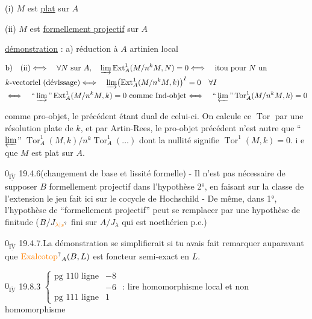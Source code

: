 (i) $M$ est \uline{plat} sur $A$

(ii) $M$ est \uline{formellement projectif} sur $A$

\uline{démonstration} : a) réduction à $A$ artinien local

\[
\begin{aligned}
&\text{b)}\quad\mathrm{(ii)}\Longleftrightarrow\quad\forall N\text{ sur }A,\quad\varinjlim\operatorname{Ext}^1_A(M/n^kM,N)=0\Longleftrightarrow\quad\text{itou pour }N\text{ un}\\
&k\text{-vectoriel (dévissage)}\Longleftrightarrow\quad\varinjlim\bigl(\operatorname{Ext}^1_A(M/n^kM,k)\bigr)^I=0\quad\forall I\\
&\Longleftrightarrow\quad\text{``}\varinjlim\text{''}\operatorname{Ext}^1_A(M/n^kM,k)=0\ \text{comme Ind-objet}\Longleftrightarrow\quad\text{``}\varprojlim\text{''}\operatorname{Tor}^1_A(M/n^kM,k)=0
\end{aligned}
\]

comme pro-objet, le précédent étant dual de celui-ci. On calcule ce $\operatorname{Tor}$ par une résolution plate de $k$, et par Artin-Rees, le pro-objet précédent n'est autre que ``$\varprojlim$'' $\operatorname{Tor}^1_A(M,k)/n^k\operatorname{Tor}^1_A(\ldots)$ dont la nullité signifie $\operatorname{Tor}^1(M,k)=0$. i e que $M$ est plat sur $A$.

$0_{\overline{\underline{\mathrm{IV}}}}$ 19.4.6\qquad (changement de base et lissité formelle) - Il n'est pas nécessaire de supposer $B$ formellement projectif dans l'hypothèse 2°, en faisant sur la classe de l'extension le jeu fait ici sur le cocycle de Hochschild - De même, dans 1°, l'hypothèse de ``formellement projectif'' peut se remplacer par une hypothèse de finitude ($B/J_{\unsure{\lambda|s}}$ fini sur $A/J_\lambda$ qui est noethérien p.e.)


$0_{\overline{\underline{\mathrm{IV}}}}$ 19.4.7.\qquad La démonstration se simplifierait si tu avais fait remarquer auparavant que $\operatorname{\unsure{Exalcotop}}_A(B,L)$ est foncteur semi-exact en $L$.

$0_{\overline{\underline{\mathrm{IV}}}}$ 19.8.3\quad
$\left\{\begin{array}{ll}\text{pg 110 ligne}&-8\\&-6\\\text{pg 111 ligne}&1\end{array}\right.$ : lire homomorphisme local \quad et non \quad homomorphisme

